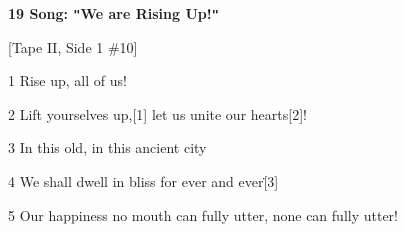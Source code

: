 
\textbf{19 Song: \texttt{"}We are Rising Up!\texttt{"}}

[Tape II, Side 1 \#10]

1 Rise up, all of us!

2 Lift yourselves up,[1] let us unite our hearts[2]!

3 In this old, in this ancient city

4 We shall dwell in bliss for ever and ever\.[3]

5 Our happiness no mouth can fully utter, none can fully utter!

